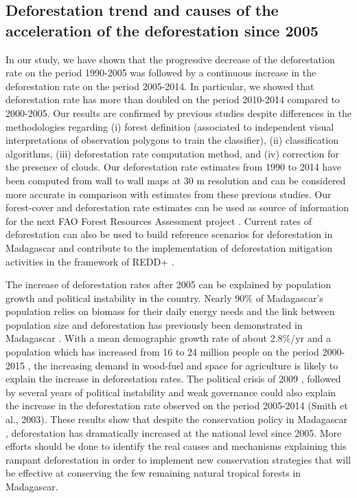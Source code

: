 \documentclass[a4paper, 12pt, leqno]{article} %
\begin{document}
\subsection{Deforestation trend and causes of the acceleration of the
  deforestation since 2005}

In our study, we have shown that the progressive decrease of the
deforestation rate on the period 1990-2005 was followed by a continuous
increase in the deforestation rate on the period 2005-2014. In
particular, we showed that deforestation rate has more than doubled on
the period 2010-2014 compared to 2000-2005. Our results are confirmed by
previous studies \citep{Harper2007, MEFT2009, ONE2015} despite
differences in the methodologies regarding (i) forest definition
(associated to independent visual interpretations of observation
polygons to train the classifier), (ii) classification algorithms, (iii)
deforestation rate computation method, and (iv) correction for the
presence of clouds. Our deforestation rate estimates from 1990 to 2014
have been computed from wall to wall maps at 30 m resolution and can be
considered more accurate in comparison with estimates from these
previous studies. Our forest-cover and deforestation rate estimates can
be used as source of information for the next FAO Forest Resources
Assessment project \citep{Keenan2015}. Current rates of deforestation
can also be used to build reference scenarios for deforestation in
Madagascar and contribute to the implementation of deforestation
mitigation activities in the framework of REDD+ \citep{Olander2008}.

The increase of deforestation rates after 2005 can be explained by
population growth and political instability in the country. Nearly 90\%
of Madagascar's population relies on biomass for their daily energy
needs \citep{Minten2013} and the link between population size and
deforestation has previously been demonstrated in Madagascar
\citep{Vieilledent2013, Gorenflo2011}. With a mean demographic growth
rate of about 2.8\%/yr and a population which has increased from 16 to
24 million people on the period 2000-2015 \citep{UN2015}, the increasing
demand in wood-fuel and space for agriculture is likely to explain the
increase in deforestation rates. The political crisis of 2009
\citep{Ploch2012}, followed by several years of political instability
and weak governance could also explain the increase in the deforestation
rate observed on the period 2005-2014 (Smith et al., 2003). These
results show that despite the conservation policy in Madagascar
\citep{Freudenberger2010}, deforestation has dramatically increased at
the national level since 2005. More efforts should be done to identify
the real causes and mechanisms explaining this rampant deforestation in
order to implement new conservation strategies that will be effective at
conserving the few remaining natural tropical forests in Madagascar.
\end{document}
